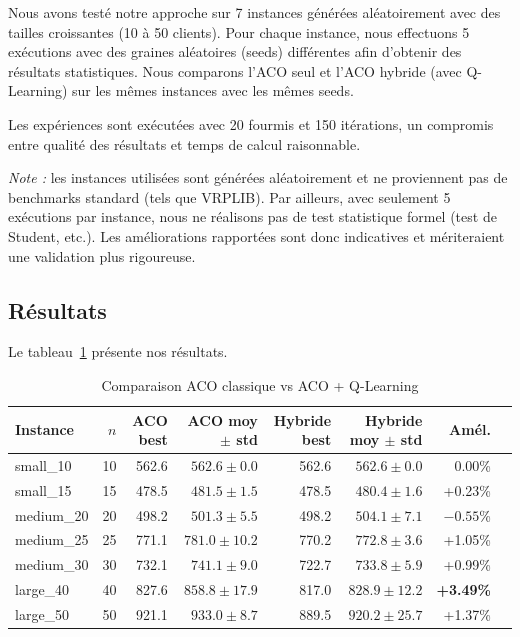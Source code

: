 \documentclass[12pt, a4paper]{article}
\begin{document}
Nous avons testé notre approche sur 7 instances générées aléatoirement avec des tailles croissantes (10 à 50 clients). Pour chaque instance, nous effectuons 5 exécutions avec des graines aléatoires (seeds) différentes afin d'obtenir des résultats statistiques. Nous comparons l'ACO seul et l'ACO hybride (avec Q-Learning) sur les mêmes instances avec les mêmes seeds.

Les expériences sont exécutées avec 20 fourmis et 150 itérations, un compromis entre qualité des résultats et temps de calcul raisonnable.

\textit{Note :} les instances utilisées sont générées aléatoirement et ne proviennent pas de benchmarks standard (tels que VRPLIB). Par ailleurs, avec seulement 5 exécutions par instance, nous ne réalisons pas de test statistique formel (test de Student, etc.). Les améliorations rapportées sont donc indicatives et mériteraient une validation plus rigoureuse.

\subsection{Résultats}

Le tableau~\ref{tab:results} présente nos résultats.

\begin{table}[H]
\centering
\caption{Comparaison ACO classique vs ACO + Q-Learning}
\label{tab:results}
\begin{tabular}{l r r r r r r r}
\toprule
\textbf{Instance} & \textbf{$n$} & \textbf{ACO best} & \textbf{ACO moy $\pm$ std} & \textbf{Hybride best} & \textbf{Hybride moy $\pm$ std} & \textbf{Amél.} \\
\midrule
small\_10  & 10 & 562.6 & $562.6 \pm 0.0$ & 562.6 & $562.6 \pm 0.0$ & 0.00\% \\
small\_15  & 15 & 478.5 & $481.5 \pm 1.5$ & 478.5 & $480.4 \pm 1.6$ & +0.23\% \\
medium\_20 & 20 & 498.2 & $501.3 \pm 5.5$ & 498.2 & $504.1 \pm 7.1$ & $-0.55$\% \\
medium\_25 & 25 & 771.1 & $781.0 \pm 10.2$ & 770.2 & $772.8 \pm 3.6$ & +1.05\% \\
medium\_30 & 30 & 732.1 & $741.1 \pm 9.0$ & 722.7 & $733.8 \pm 5.9$ & +0.99\% \\
large\_40  & 40 & 827.6 & $858.8 \pm 17.9$ & 817.0 & $828.9 \pm 12.2$ & \textbf{+3.49\%} \\
large\_50  & 50 & 921.1 & $933.0 \pm 8.7$ & 889.5 & $920.2 \pm 25.7$ & +1.37\% \\
\bottomrule
\end{tabular}
\end{table}
\end{document}
